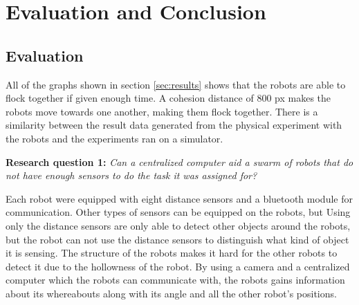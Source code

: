\chapter{Evaluation and Conclusion}
\label{cha:evaluationAndConclusion}




\section{Evaluation}
\label{sec:Evaluation}
All of the graphs shown in section \ref{sec:results} shows that the robots are able to flock together if given enough time. A cohesion distance of 800 px makes the robots move towards one another, making them flock together. There is a similarity between the result data generated from the physical experiment with the robots and the experiments ran on a simulator.

\textbf{Research question 1:} {\it Can a centralized computer aid a swarm of robots that do not have enough sensors to do the task it was assigned for?}

Each robot were equipped with eight distance sensors and a bluetooth module for communication. Other types of sensors can be equipped on the robots, but 
Using only the distance sensors are only able to detect other objects around the robots, but the robot can not use the distance sensors to distinguish what kind of object it is sensing. The structure of the robots makes it hard for the other robots to detect it due to the hollowness of the robot. 
By using a camera and a centralized computer which the robots can communicate with, the robots gains information about its whereabouts along with its angle and all the other robot's positions. 








